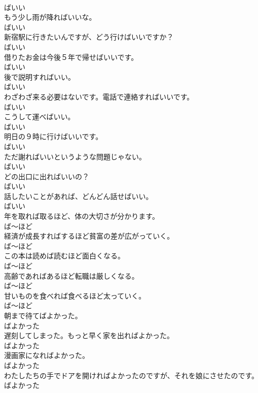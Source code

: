 \documentclass[8pt]{extreport}
\begin{document}
\begin{CJK}{UTF8}{min}
\\	ばいい	
\\	もう少し雨が降ればいいな。	
\\	ばいい	
\\	新宿駅に行きたいんですが、どう行けばいいですか？	
\\	ばいい	
\\	借りたお金は今後５年で帰せばいいです。	
\\	ばいい	
\\	後で説明すればいい。	
\\	ばいい	
\\	わざわざ来る必要はないです。電話で連絡すればいいです。	
\\	ばいい	
\\	こうして運べばいい。	
\\	ばいい	
\\	明日の９時に行けばいいです。	
\\	ばいい	
\\	ただ謝ればいいというような問題じゃない。	
\\	ばいい	
\\	どの出口に出ればいいの？	
\\	ばいい	
\\	話したいことがあれば、どんどん話せばいい。	
\\	ばいい	
\\	年を取れば取るほど、体の大切さが分かります。	
\\	ば～ほど	
\\	経済が成長すればするほど貧富の差が広がっていく。	
\\	ば～ほど	
\\	この本は読めば読むほど面白くなる。	
\\	ば～ほど	
\\	高齢であればあるほど転職は厳しくなる。	
\\	ば～ほど	
\\	甘いものを食べれば食べるほど太っていく。	
\\	ば～ほど	
\\	朝まで待てばよかった。	
\\	ばよかった	
\\	遅刻してしまった。もっと早く家を出ればよかった。	
\\	ばよかった	
\\	漫画家になればよかった。	
\\	ばよかった	
\\	わたしたちの手でドアを開ければよかったのですが、それを娘にさせたのです。	
\\	ばよかった	

\end{CJK}
\end{document}
